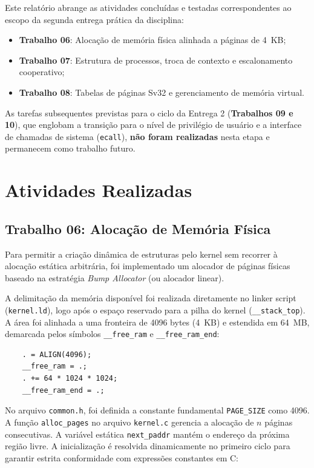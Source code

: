 \documentclass[12pt]{article}
\begin{document}
Este relatório abrange as atividades concluídas e testadas correspondentes ao escopo da segunda entrega prática da disciplina:
\begin{itemize}
    \item \textbf{Trabalho 06}: Alocação de memória física alinhada a páginas de 4~KB;
    \item \textbf{Trabalho 07}: Estrutura de processos, troca de contexto e escalonamento cooperativo;
    \item \textbf{Trabalho 08}: Tabelas de páginas Sv32 e gerenciamento de memória virtual.
\end{itemize}

As tarefas subsequentes previstas para o ciclo da Entrega 2 (\textbf{Trabalhos 09 e 10}), que englobam a transição para o nível de privilégio de usuário e a interface de chamadas de sistema (\texttt{ecall}), \textbf{não foram realizadas} nesta etapa e permanecem como trabalho futuro.

\section{Atividades Realizadas}

\subsection{Trabalho 06: Alocação de Memória Física}

Para permitir a criação dinâmica de estruturas pelo kernel sem recorrer à alocação estática arbitrária, foi implementado um alocador de páginas físicas baseado na estratégia \textit{Bump Allocator} (ou alocador linear).

A delimitação da memória disponível foi realizada diretamente no linker script (\texttt{kernel.ld}), logo após o espaço reservado para a pilha do kernel (\texttt{\_\_stack\_top}). A área foi alinhada a uma fronteira de 4096 bytes (4~KB) e estendida em 64~MB, demarcada pelos símbolos \texttt{\_\_free\_ram} e \texttt{\_\_free\_ram\_end}:

\begin{verbatim}
    . = ALIGN(4096);
    __free_ram = .;
    . += 64 * 1024 * 1024;
    __free_ram_end = .;
\end{verbatim}

No arquivo \texttt{common.h}, foi definida a constante fundamental \texttt{PAGE\_SIZE} como 4096. A função \texttt{alloc\_pages} no arquivo \texttt{kernel.c} gerencia a alocação de $n$ páginas consecutivas. A variável estática \texttt{next\_paddr} mantém o endereço da próxima região livre. A inicialização é resolvida dinamicamente no primeiro ciclo para garantir estrita conformidade com expressões constantes em C:
\end{document}
